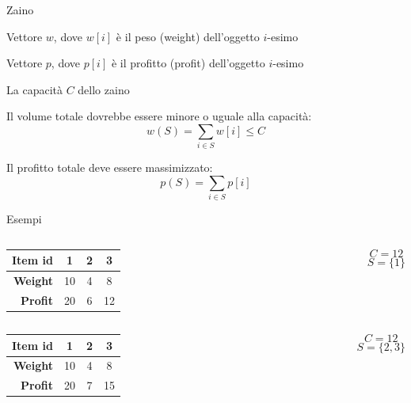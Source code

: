 \begin{frame}{Zaino}

\BIL
\item Vettore $w$, dove \alert{$w[i]$} è il \alert{peso} (\alert{weight}) dell'oggetto $i$-esimo
\item Vettore $p$, dove \alert{$p[i]$} è il \alert{profitto} (\alert{profit}) dell'oggetto $i$-esimo
\item La \alert{capacità} $C$ dello zaino
\EIL

\bigskip
{}
\BI
\item Il \alert{volume totale} dovrebbe essere minore o uguale alla capacità: 
\vspace{3pt}
\[
w(S) = \sum_{i \in S} w[i] \leq C
\]
\item Il \alert{profitto totale} deve essere massimizzato:
\vspace{3pt}
\[
p(S) = \sum_{i \in S} p[i]
\]
\EI

\end{frame}

\begin{frame}{Esempi}


\begin{columns}[T]
\begin{tabular}{|r|c|c|c|}
\hline
\textbf{Item id} & \textbf{1} & \textbf{2} & \textbf{3} \\\hline
\textbf{Weight} & 10 & 4 & 8 \\\hline
\textbf{Profit} & 20 & 6 & 12 \\\hline 
\end{tabular} 
\[C=12\]
\pause
{}
\[S = \{1 \}\]
\end{columns}

\bigskip
{}

\pause
\bigskip
{}

\begin{columns}[T]
\begin{tabular}{|r|c|c|c|}
\hline
\textbf{Item id} & \textbf{1} & \textbf{2} & \textbf{3} \\\hline
\textbf{Weight} & 10 & 4 & 8 \\\hline
\textbf{Profit} & 20 & 7 & 15 \\\hline 
\end{tabular}
\[C=12\]
\pause
{}
\[S = \{ 2,3 \}\]
\end{columns}
\end{frame}

